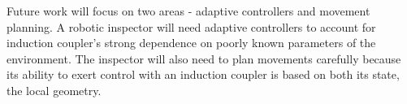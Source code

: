 \documentclass[10pt]{article}
\begin{document}
Future work will focus on two areas - adaptive controllers and movement planning. A robotic inspector will need adaptive controllers to account for induction coupler's strong dependence on poorly known parameters of the environment.  The inspector will also need to plan movements carefully because its ability to exert control with an induction coupler is based on both its state, the local geometry.  

    
\end{document}
